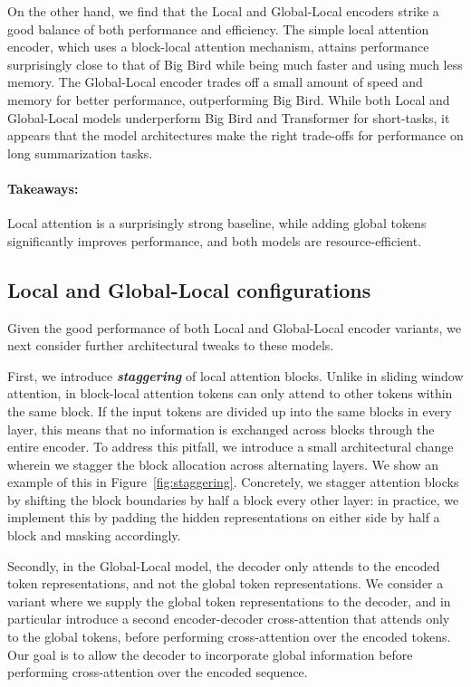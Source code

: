 \documentclass[11pt]{article}
\begin{document}
On the other hand, we find that the Local and Global-Local encoders strike a good balance of both performance and efficiency. 
The simple local attention encoder, which uses a block-local attention mechanism, attains performance surprisingly close to that of Big Bird while being much faster and using much less memory.
The Global-Local encoder trades off a small amount of speed and memory for better performance, outperforming Big Bird.
While both Local and Global-Local models underperform Big Bird and Transformer for short-tasks, it appears that the model architectures make the right trade-offs for performance on long summarization tasks.

\paragraph{Takeaways:} Local attention is a surprisingly strong baseline, while adding global tokens significantly improves performance, and both models are resource-efficient.



\subsection{Local and Global-Local configurations}

\label{section:ablation_global_and_local_configs}

Given the good performance of both Local and Global-Local encoder variants, we next consider further architectural tweaks to these models.

First, we introduce \emph{\textbf{staggering}} of local attention blocks. Unlike in sliding window attention, in block-local attention tokens can only attend to other tokens within the same block.
If the input tokens are divided up into the same blocks in every layer, this means that no information is exchanged across blocks through the entire encoder.
To address this pitfall, we introduce a small architectural change wherein we stagger the block allocation across alternating layers.
We show an example of this in Figure~\ref{fig:staggering}.
Concretely, we stagger attention blocks by shifting the block boundaries by half a block every other layer: in practice, we implement this by padding the hidden representations on either side by half a block and masking accordingly.

Secondly, in the Global-Local model, the decoder only attends to the encoded token representations, and not the global token representations.
We consider a variant where we supply the global token representations to the decoder, and in particular introduce a second encoder-decoder cross-attention that attends only to the global tokens, before performing cross-attention over the encoded tokens.
Our goal is to allow the decoder to incorporate global information before performing cross-attention over the encoded sequence.
\end{document}
